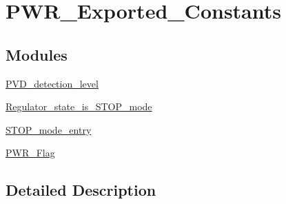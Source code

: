 \hypertarget{group___p_w_r___exported___constants}{}\section{P\+W\+R\+\_\+\+Exported\+\_\+\+Constants}
\label{group___p_w_r___exported___constants}
\subsection*{Modules}
\begin{DoxyCompactItemize}
\item 
\hyperlink{group___p_v_d__detection__level}{P\+V\+D\+\_\+detection\+\_\+level}
\item 
\hyperlink{group___regulator__state__is___s_t_o_p__mode}{Regulator\+\_\+state\+\_\+is\+\_\+\+S\+T\+O\+P\+\_\+mode}
\item 
\hyperlink{group___s_t_o_p__mode__entry}{S\+T\+O\+P\+\_\+mode\+\_\+entry}
\item 
\hyperlink{group___p_w_r___flag}{P\+W\+R\+\_\+\+Flag}
\end{DoxyCompactItemize}


\subsection{Detailed Description}
